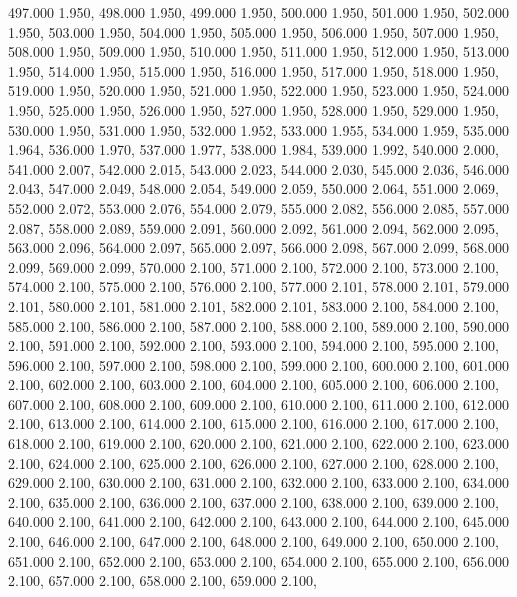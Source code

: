 497.000 1.950, 
498.000 1.950, 
499.000 1.950, 
500.000 1.950, 
501.000 1.950, 
502.000 1.950, 
503.000 1.950, 
504.000 1.950, 
505.000 1.950, 
506.000 1.950, 
507.000 1.950, 
508.000 1.950, 
509.000 1.950, 
510.000 1.950, 
511.000 1.950, 
512.000 1.950, 
513.000 1.950, 
514.000 1.950, 
515.000 1.950, 
516.000 1.950, 
517.000 1.950, 
518.000 1.950, 
519.000 1.950, 
520.000 1.950, 
521.000 1.950, 
522.000 1.950, 
523.000 1.950, 
524.000 1.950, 
525.000 1.950, 
526.000 1.950, 
527.000 1.950, 
528.000 1.950, 
529.000 1.950, 
530.000 1.950, 
531.000 1.950, 
532.000 1.952, 
533.000 1.955, 
534.000 1.959, 
535.000 1.964, 
536.000 1.970, 
537.000 1.977, 
538.000 1.984, 
539.000 1.992, 
540.000 2.000, 
541.000 2.007, 
542.000 2.015, 
543.000 2.023, 
544.000 2.030, 
545.000 2.036, 
546.000 2.043, 
547.000 2.049, 
548.000 2.054, 
549.000 2.059, 
550.000 2.064, 
551.000 2.069, 
552.000 2.072, 
553.000 2.076, 
554.000 2.079, 
555.000 2.082, 
556.000 2.085, 
557.000 2.087, 
558.000 2.089, 
559.000 2.091, 
560.000 2.092, 
561.000 2.094, 
562.000 2.095, 
563.000 2.096, 
564.000 2.097, 
565.000 2.097, 
566.000 2.098, 
567.000 2.099, 
568.000 2.099, 
569.000 2.099, 
570.000 2.100, 
571.000 2.100, 
572.000 2.100, 
573.000 2.100, 
574.000 2.100, 
575.000 2.100, 
576.000 2.100, 
577.000 2.101, 
578.000 2.101, 
579.000 2.101, 
580.000 2.101, 
581.000 2.101, 
582.000 2.101, 
583.000 2.100, 
584.000 2.100, 
585.000 2.100, 
586.000 2.100, 
587.000 2.100, 
588.000 2.100, 
589.000 2.100, 
590.000 2.100, 
591.000 2.100, 
592.000 2.100, 
593.000 2.100, 
594.000 2.100, 
595.000 2.100, 
596.000 2.100, 
597.000 2.100, 
598.000 2.100, 
599.000 2.100, 
600.000 2.100, 
601.000 2.100, 
602.000 2.100, 
603.000 2.100, 
604.000 2.100, 
605.000 2.100, 
606.000 2.100, 
607.000 2.100, 
608.000 2.100, 
609.000 2.100, 
610.000 2.100, 
611.000 2.100, 
612.000 2.100, 
613.000 2.100, 
614.000 2.100, 
615.000 2.100, 
616.000 2.100, 
617.000 2.100, 
618.000 2.100, 
619.000 2.100, 
620.000 2.100, 
621.000 2.100, 
622.000 2.100, 
623.000 2.100, 
624.000 2.100, 
625.000 2.100, 
626.000 2.100, 
627.000 2.100, 
628.000 2.100, 
629.000 2.100, 
630.000 2.100, 
631.000 2.100, 
632.000 2.100, 
633.000 2.100, 
634.000 2.100, 
635.000 2.100, 
636.000 2.100, 
637.000 2.100, 
638.000 2.100, 
639.000 2.100, 
640.000 2.100, 
641.000 2.100, 
642.000 2.100, 
643.000 2.100, 
644.000 2.100, 
645.000 2.100, 
646.000 2.100, 
647.000 2.100, 
648.000 2.100, 
649.000 2.100, 
650.000 2.100, 
651.000 2.100, 
652.000 2.100, 
653.000 2.100, 
654.000 2.100, 
655.000 2.100, 
656.000 2.100, 
657.000 2.100, 
658.000 2.100, 
659.000 2.100, 
